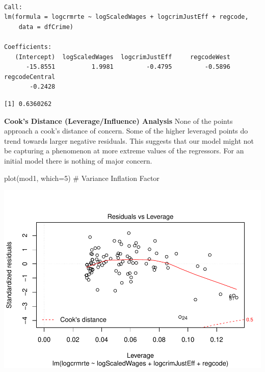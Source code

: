 \documentclass[]{article}
\newenvironment{Shaded}{}{}
\newcommand{\CommentTok}[1]{\textcolor[rgb]{0.00,0.50,0.00}{#1}}
\newcommand{\DataTypeTok}[1]{#1}
\newcommand{\DecValTok}[1]{#1}
\newcommand{\KeywordTok}[1]{\textcolor[rgb]{0.00,0.00,1.00}{#1}}
\newcommand{\NormalTok}[1]{#1}
\newcommand{\OperatorTok}[1]{#1}
\begin{document}
\begin{verbatim}

Call:
lm(formula = logcrmrte ~ logScaledWages + logcrimJustEff + regcode, 
    data = dfCrime)

Coefficients:
   (Intercept)  logScaledWages  logcrimJustEff     regcodeWest  
      -15.8551          1.9981         -0.4795         -0.5896  
regcodeCentral  
       -0.2428  
\end{verbatim}

\begin{Shaded}
\end{Shaded}

\begin{verbatim}
[1] 0.6360262
\end{verbatim}

\textbf{Cook's Distance (Leverage/Influence) Analysis} None of the
points approach a cook's distance of concern. Some of the higher
leveraged points do trend towards larger negative residuals. This
suggests that our model might not be capturing a phenomenon at more
extreme values of the regressors. For an initial model there is nothing
of major concern.

\begin{Shaded}
\begin{Highlighting}[]
\KeywordTok{plot}\NormalTok{(mod1, }\DataTypeTok{which=}\DecValTok{5}\NormalTok{) }\CommentTok{# Variance Inflation Factor}
\end{Highlighting}
\end{Shaded}

\includegraphics{Bagnard_Gaustad_Hartman_Leung_Lab_3_files/figure-latex/unnamed-chunk-61-1.pdf}
\end{document}
